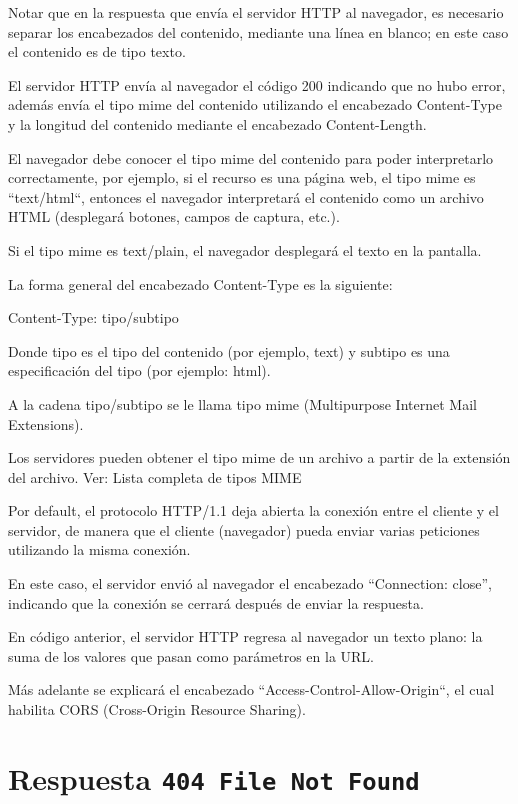 Notar que en la respuesta que envía el servidor HTTP al navegador, es necesario separar los encabezados del contenido, mediante una línea en blanco; en este caso el contenido es de tipo texto.

El servidor HTTP envía al navegador el código 200 indicando que no hubo error, además envía el tipo mime del contenido utilizando el encabezado Content-Type y la longitud del contenido mediante el encabezado Content-Length.

El navegador debe conocer el tipo mime del contenido para poder interpretarlo correctamente, por ejemplo, si el recurso es una página web, el tipo mime es ``text/html``, entonces el navegador interpretará el contenido como un archivo HTML (desplegará botones, campos de captura, etc.).

Si el tipo mime es text/plain, el navegador desplegará el texto en la pantalla.

La forma general del encabezado Content-Type es la siguiente:

\begin{SourceCode}
Content-Type: tipo/subtipo
\end{SourceCode}

Donde tipo es el tipo del contenido (por ejemplo, text) y subtipo es una especificación del tipo (por ejemplo: html).

A la cadena tipo/subtipo se le llama tipo mime (Multipurpose Internet Mail Extensions).

Los servidores pueden obtener el tipo mime de un archivo a partir de la extensión del archivo. Ver: Lista completa de tipos MIME

Por default, el protocolo HTTP/1.1 deja abierta la conexión entre el cliente y el servidor, de manera que el cliente (navegador) pueda enviar varias peticiones utilizando la misma conexión.

En este caso, el servidor envió al navegador el encabezado “Connection: close”, indicando que la conexión se cerrará después de enviar la respuesta.

En código anterior, el servidor HTTP regresa al navegador un texto plano: la suma de los valores que pasan como parámetros en la URL.

Más adelante se explicará el encabezado ``Access-Control-Allow-Origin``, el cual habilita CORS (Cross-Origin Resource Sharing).

\section{Respuesta \texttt{404 File Not Found}}

